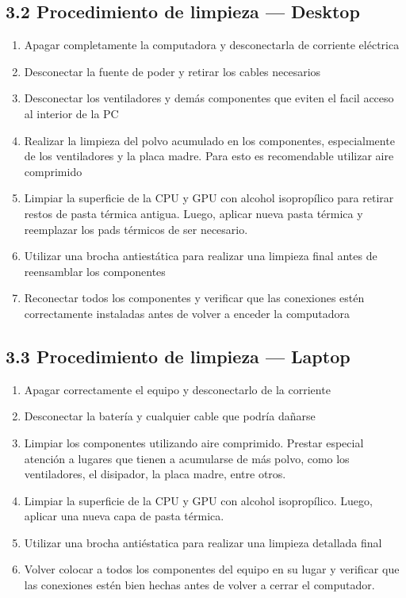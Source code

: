 \documentclass{article}
\begin{document}
\subsection{3.2 Procedimiento de limpieza — Desktop}
\label{sec:org309f34c}
\begin{enumerate}
\item Apagar completamente la computadora y desconectarla de corriente eléctrica
\item Desconectar la fuente de poder y retirar los cables necesarios
\item Desconectar los ventiladores y demás componentes que eviten el
facil acceso al interior de la PC
\item Realizar la limpieza del polvo acumulado en los componentes,
especialmente de los ventiladores y la placa madre. Para esto es
recomendable utilizar aire comprimido
\item Limpiar la superficie de la CPU y GPU con alcohol isopropílico
para retirar restos de pasta térmica antigua. Luego, aplicar
nueva pasta térmica y reemplazar los pads térmicos de ser
necesario.
\item Utilizar una brocha antiestática para realizar una limpieza final
antes de reensamblar los componentes
\item Reconectar todos los componentes y verificar que las conexiones
estén correctamente instaladas antes de volver a enceder la computadora
\end{enumerate}

\subsection{3.3 Procedimiento de limpieza — Laptop}
\label{sec:orga44fa9c}
\begin{enumerate}
\item Apagar correctamente el equipo y desconectarlo de la corriente
\item Desconectar la batería y cualquier cable que podría dañarse
\item Limpiar los componentes utilizando aire comprimido. Prestar
especial atención a lugares que tienen a acumularse de más
polvo, como los ventiladores, el disipador, la placa madre,
entre otros.
\item Limpiar la superficie de la CPU y GPU con alcohol
isopropílico. Luego, aplicar una nueva capa de pasta térmica.
\item Utilizar una brocha antiéstatica para realizar una limpieza
detallada final
\item Volver colocar a todos los componentes del equipo en su lugar y
verificar que las conexiones estén bien hechas antes de volver a
cerrar el computador.
\end{enumerate}
\end{document}
